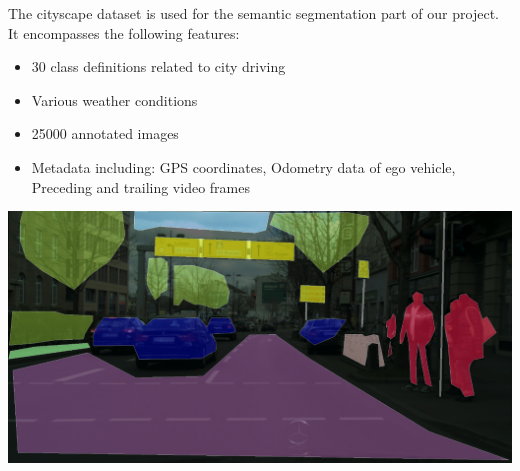 \begin{multicols*}{2}
The cityscape dataset is used for the semantic segmentation part of our project. It encompasses the following features:
\begin{itemize}	
	\item 30 class definitions related to city driving
	\item Various weather conditions
	\item 25000 annotated images
	\item Metadata including: GPS coordinates, Odometry data of ego vehicle, Preceding and trailing video frames
\end{itemize}
\begin{minipage}{0.25\textwidth}
\centering
  \includegraphics[width=0.5\linewidth]{images/cityscapes_dataset.png}
\end{minipage}
\end{multicols*}
